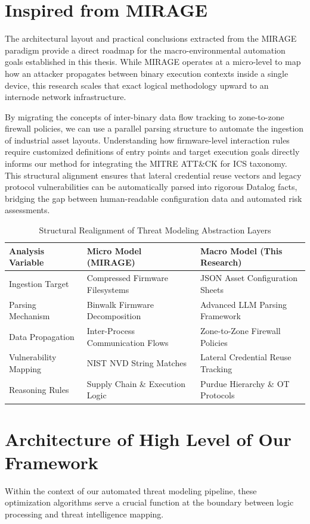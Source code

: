 \documentclass[target=mst,aauheader=aics,style=]{thud}
\begin{document}
\section{Inspired from MIRAGE}
The architectural layout and practical conclusions extracted from the MIRAGE paradigm provide a direct roadmap for the macro-environmental automation goals established in this thesis. While MIRAGE operates at a micro-level to map how an attacker propagates between binary execution contexts inside a single device, this research scales that exact logical methodology upward to an internode network infrastructure. 

By migrating the concepts of inter-binary data flow tracking to zone-to-zone firewall policies, we can use a parallel parsing structure to automate the ingestion of industrial asset layouts. Understanding how firmware-level interaction rules require customized definitions of entry points and target execution goals directly informs our method for integrating the MITRE ATT&CK for ICS taxonomy. This structural alignment ensures that lateral credential reuse vectors and legacy protocol vulnerabilities can be automatically parsed into rigorous Datalog facts, bridging the gap between human-readable configuration data and automated risk assessments.

\begin{table}[htbp]
\centering
\caption{Structural Realignment of Threat Modeling Abstraction Layers}
\begin{tabular}{lll}
\toprule
\textbf{Analysis Variable} & \textbf{Micro Model (MIRAGE)} & \textbf{Macro Model (This Research)} \\
\midrule
Ingestion Target & Compressed Firmware Filesystems & JSON Asset Configuration Sheets \\
Parsing Mechanism & Binwalk Firmware Decomposition & Advanced LLM Parsing Framework \\
Data Propagation & Inter-Process Communication Flows & Zone-to-Zone Firewall Policies \\
Vulnerability Mapping & NIST NVD String Matches & Lateral Credential Reuse Tracking \\
Reasoning Rules & Supply Chain \& Execution Logic & Purdue Hierarchy \& OT Protocols \\
\bottomrule
\end{tabular}
\end{table}

\section{Architecture of High Level of Our Framework}
Within the context of our automated threat modeling pipeline, these optimization algorithms serve a crucial function at the boundary between logic processing and threat intelligence mapping. 
\end{document}
